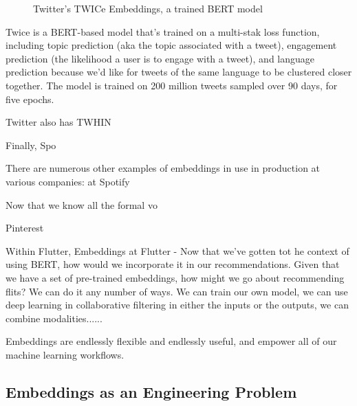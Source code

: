 \documentclass[11pt, table]{diazessay} %
\begin{document}
\begin{sloppypar}
\begin{figure}[H]
\caption{Twitter's TWICe Embeddings, a trained BERT model\citep{liu2022twice}}
\end{figure}

Twice is a BERT-based model that's trained on a multi-stak loss function, including topic prediction (aka the topic associated with a tweet), engagement prediction (the likelihood a user is to engage with a tweet), and language prediction because we'd like for tweets of the same language to be clustered closer together. The model is trained on 200 million tweets sampled over 90 days, for five epochs.

Twitter also has TWHIN

Finally, Spo



There are numerous other examples of embeddings in use in production at various companies: at Spotify 


Now that we know all the formal vo




Pinterest


Within Flutter, 
Embeddings at Flutter - Now that we've gotten tot he context of using BERT, how would we incorporate it in our recommendations. Given that we have a set of pre-trained embeddings, how might we go about recommending flits?  We can do it any number of ways. We can train our own model, we can use deep learning in collaborative filtering in either the inputs or the outputs, we can combine modalities......

Embeddings are endlessly flexible and endlessly useful, and empower all of our machine learning workflows. 

\subsection{Embeddings as an Engineering Problem}


\end{sloppypar}
\end{document}
